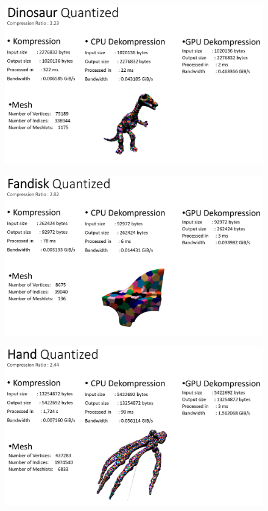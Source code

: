 \begin{figure}[h]
  \centering  
  \includegraphics[scale=0.28]{Bilder/ergebnisse_full/dinosaur_quantized.png}
\end{figure}
\begin{figure}[h]
  \centering  
  \includegraphics[scale=0.28]{Bilder/ergebnisse_full/fandisk_quantized.png}
\end{figure}
\begin{figure}[h]
  \centering  
  \includegraphics[scale=0.28]{Bilder/ergebnisse_full/hand_quantized.png}
\end{figure}
